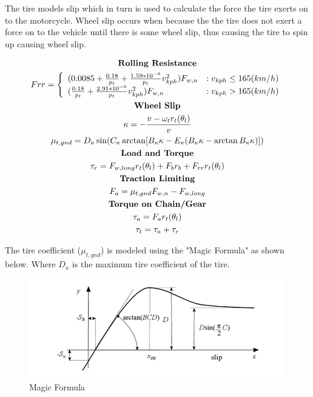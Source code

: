 \documentclass[../SimBALink.tex]{subfiles}
\begin{document}
The tire models slip which in turn is used to calculate the force the tire exerts on to the motorcycle. Wheel slip occurs when because the the tire does not exert a force on to the vehicle until there is some wheel slip, thus causing the tire to spin up causing wheel slip.

\begin{gather}
\notag \textbf{Rolling Resistance} \\
Frr = 
\left\{
  \begin{array}{lr}
    (0.0085 + \frac{0.18}{p_t} + \frac{1.59*10^{-6}}{p_t}v_{kph}^2)F_{w,n} & : v_{kph} \le 165 (km/h)\\
    (\frac{0.18}{p_t} + \frac{2.91*10^{-6}}{p_t}v_{kph}^2)F_{w,n} & : v_{kph} > 165 (km/h)
  \end{array}
\right. \\
\notag \textbf{Wheel Slip} \\
\kappa = -\frac{v - \omega_t r_t(\theta_l)}{v} \\
\mu_{t,gnd} =  D_{\kappa}\sin(C_{\kappa} \arctan[B_{\kappa}\kappa - E_{\kappa}(B_{\kappa}\kappa - \arctan B_{\kappa}\kappa)])  \\
\notag \textbf{Load and Torque} \\
\tau_r = F_{w,long}r_t(\theta_l) + F_br_b + F_{rr}r_t(\theta_l) \\
\notag \textbf{Traction Limiting} \\
F_a = \mu_{t,gnd} F_{w,n} - F_{w,long} \\
\notag \textbf{Torque on Chain/Gear} \\
\tau_a = F_ar_t(\theta_l) \\
\tau_t = \tau_a + \tau_r
\end{gather}

The tire coefficient ($\mu_{t,gnd}$) is modeled using the "Magic Formula" as shown below. Where $D_{\kappa}$ is the maximum tire coefficient of the tire. 

 \begin{figure}[H]
  \centering
  \includegraphics[scale=1]{magic_formula}
  \caption{Magic Formula }
\end{figure}
\end{document}
